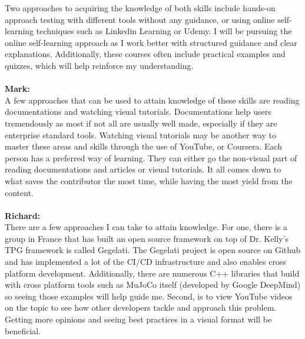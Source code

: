 \documentclass[12pt, titlepage]{article}
\begin{document}
\noindent Two approaches to acquiring the knowledge of both skills include hands-on approach testing with different tools without any guidance, or using online self-learning techniques such as Linkedin Learning or Udemy. I will be pursuing the online self-learning approach as I work better with structured guidance and clear explanations. Additionally, these courses often include practical examples and quizzes, which will help reinforce my understanding.
\\\\
\textbf{Mark:}
\\
A few approaches that can be used to attain knowledge of these skills are reading documentations and watching visual tutorials. Documentations help users tremendously as most if not all are usually well made, especially if they are enterprise standard tools. Watching visual tutorials may be another way to master these areas and skills through the use of YouTube, or Coursera. Each person has a preferred way of learning. They can either go the non-visual part of reading documentations and articles or visual tutorials. It all comes down to what saves the contributor the most time, while having the most yield from the content.
\\\\
\textbf{Richard:}\\

\noindent There are a few approaches I can take to attain knowledge. For one, there is a group in France that has built an open source framework on top of Dr. Kelly's TPG framework is called Gegelati. The Gegelati project is open source on Github and has implemented a lot of the CI/CD infrastructure and also enables cross platform development. Additionally, there are numerous C++ libraries that build with cross platform tools such as MuJoCo itself (developed by Google DeepMind) so seeing those examples will help guide me. Second, is to view YouTube videos on the topic to see how other developers tackle and approach this problem. Getting more opinions and seeing best practices in a visual format will be beneficial. 
\end{document}
